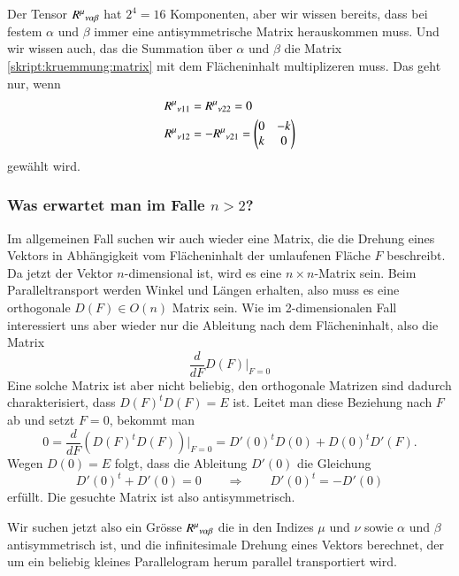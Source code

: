 Der Tensor $R^\mu\mathstrut_{\nu\alpha\beta}$ hat $2^4=16$ Komponenten,
aber wir wissen bereits, dass bei festem $\alpha$ und $\beta$
immer eine antisymmetrische Matrix herauskommen muss.
Und wir wissen auch, das die Summation über $\alpha$ und $\beta$
die Matrix \eqref{skript:kruemmung:matrix} mit dem Flächeninhalt
multiplizeren muss.
Das geht nur, wenn
\begin{align*}
R^\mu\mathstrut_{\nu11}
&=
R^\mu\mathstrut_{\nu22}=0
\\
R^\mu\mathstrut_{\nu12}
&=
-R^\mu\mathstrut_{\nu21}
=
\begin{pmatrix}0&-k\\k&0\end{pmatrix}
\end{align*}
gewählt wird.

\subsubsection{Was erwartet man im Falle $n>2$?}
Im allgemeinen Fall suchen wir auch wieder eine Matrix, die
die Drehung eines Vektors in Abhängigkeit vom Flächeninhalt der
umlaufenen Fläche $F$ beschreibt.
Da jetzt der Vektor $n$-dimensional ist, wird es eine $n\times n$-Matrix
sein.
Beim Paralleltransport werden Winkel und Längen erhalten, also muss es
eine orthogonale $D(F)\in O(n)$ Matrix sein.
Wie im 2-dimensionalen Fall interessiert uns aber wieder nur die Ableitung
nach dem Flächeninhalt, also die Matrix
\[
\frac{d}{dF}D(F)\bigg|_{F=0}
\]
Eine solche Matrix ist aber nicht beliebig, den orthogonale Matrizen
sind dadurch charakterisiert, dass $D(F)^tD(F)=E$ ist.
Leitet man diese Beziehung nach $F$ ab und setzt $F=0$, bekommt man
\[
0
=
\frac{d}{dF}(D(F)^tD(F))\bigg|_{F=0}
=
D'(0)^t D(0) + D(0)^t D'(F).
\]
Wegen $D(0)=E$ folgt, dass die Ableitung $D'(0)$ die Gleichung
\[
D'(0)^t+D'(0)=0
\qquad\Rightarrow\qquad
D'(0)^t=-D'(0)
\]
erfüllt.
Die gesuchte Matrix ist also antisymmetrisch.

Wir suchen jetzt also ein Grösse $R^\mu\mathstrut_{\nu\alpha\beta}$
die in den Indizes $\mu$ und $\nu$ sowie $\alpha$ und $\beta$
antisymmetrisch ist, und die infinitesimale Drehung eines Vektors
berechnet, der um ein beliebig kleines Parallelogram herum parallel
transportiert wird.

